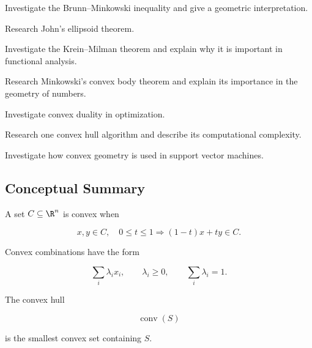 \begin{exercise}[4]
Investigate the Brunn--Minkowski inequality and give a geometric
interpretation.
\end{exercise}

\begin{exercise}[4]
Research John's ellipsoid theorem.
\end{exercise}

\begin{exercise}[4]
Investigate the Krein--Milman theorem and explain why it is important in
functional analysis.
\end{exercise}

\begin{exercise}[4]
Research Minkowski's convex body theorem and explain its importance in the
geometry of numbers.
\end{exercise}

\begin{exercise}[4]
Investigate convex duality in optimization.
\end{exercise}

\begin{exercise}[4]
Research one convex hull algorithm and describe its computational
complexity.
\end{exercise}

\begin{exercise}[4]
Investigate how convex geometry is used in support vector machines.
\end{exercise}

\subsection{Conceptual Summary}
\label{subsec:convex-geometry-summary}

A set \(C\subseteq\R^n\) is convex when

\[
\boxed{
x,y\in C,\quad0\leq t\leq1
\Longrightarrow
(1-t)x+ty\in C.
}
\]

Convex combinations have the form

\[
\boxed{
\sum_i\lambda_ix_i,
\qquad
\lambda_i\geq0,
\qquad
\sum_i\lambda_i=1.
}
\]

The convex hull

\[
\boxed{
\operatorname{conv}(S)
}
\]

is the smallest convex set containing \(S\).

